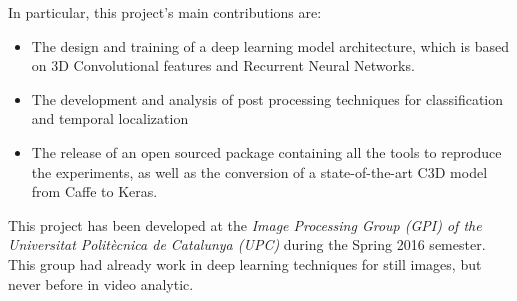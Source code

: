 In particular, this project's main contributions are:
\begin{itemize}
	\item The design and training of a deep learning model architecture, which is based on 3D Convolutional features and Recurrent Neural Networks.
    \item The development and analysis of post processing techniques for classification and temporal localization
    \item The release of an open sourced package containing all the tools to reproduce the experiments, as well as the conversion of a state-of-the-art C3D model from Caffe to Keras.

\end{itemize}


This project has been developed at the \textit{Image Processing Group (GPI) of the Universitat Politècnica de Catalunya (UPC)} during the Spring 2016 semester. This group had already work in deep learning techniques for still images, but never before in video analytic. %

